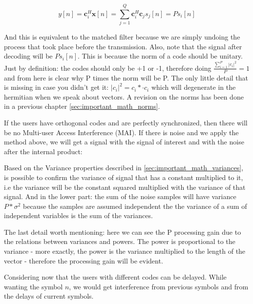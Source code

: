 \documentclass[12pt, a4paper]{article}
\begin{document}
\begin{equation}
    y[n] = \mathbf{c}^H_i \mathbf{x}[n] = \sum_{j=1}^Q \mathbf{c}^H_i \mathbf{c}_j s_j[n] = P s_i[n]
\end{equation}

And this is equivalent to the matched filter because we are simply undoing the process that took place before the transmission. Also, note that the signal after decoding will be $Ps_i[n]$. This is because the norm of a code should be unitary. Just by definition: the codes should only be +1 or -1, therefore doing $\frac{\sum^P_{i=1} |c_i|^2}{P} = 1 $ and from here is clear why P times the norm will be P. The only little detail that is missing in case you didn't get it: $|c_i|^2 = c_i*\cdot c_i$ which will degenerate in the hermitian when we speak about vectors.
A revision on the norms has been done in a previous chapter \ref{sec:important_math_norms}.

\par If the users have orthogonal codes and are perfectly synchronized, then there will be no Multi-user Access Interference (MAI). If there is noise and we apply the method above, we will get a signal with the signal of interest and with the noise after the internal product:


\par Based on the Variance properties described in \ref{sec:important_math_variances}, is possible to confirm the variance of signal that has a constant multiplied to it, i.e the variance will be the constant squared multiplied with the variance of that signal. And in the lower part: the sum of the noise samples will have variance $ P * \sigma^2$ because the samples are assumed independent the the variance of a sum of independent variables is the sum of the variances.
\par The last detail worth mentioning: here we can see the P processing gain due to the relations between variances and powers. The power is proportional to the variance  - more exactly, the power is the variance multiplied to the length of the vector - therefore the processing gain will be evident.

\vspace{.5cm}
\par Considering now that the users with different codes can be delayed. While wanting the symbol $n$, we would get interference from previous symbols and from the delays of current symbols. 
\end{document}
